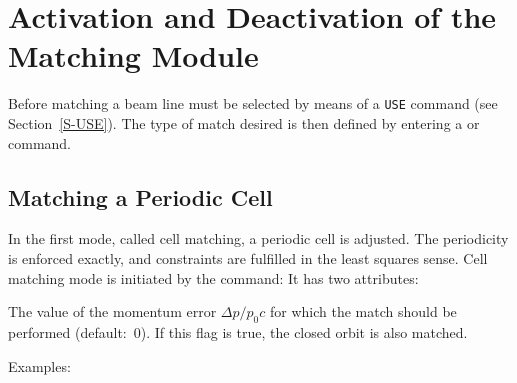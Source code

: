 \section{Activation and Deactivation of the Matching Module}
\label{S-MATACT}
Before matching a beam line must be selected by means
of a {\tt USE} command (see Section~\ref{S-USE}).
The type of match desired is then defined by entering
a  or  command.
\subsection{Matching a Periodic Cell}
In the first mode, called cell matching,
a periodic cell is adjusted.
The periodicity is enforced exactly,
and constraints are fulfilled in the least squares sense.
Cell matching mode is initiated by the  command:
It has two attributes:
\begin{mylist}
The value of the momentum error
\(\Delta p/p_0 c\) for which the match should be performed
(default:~0).
If this flag is true, the closed orbit is also matched.
\end{mylist}
Examples:

